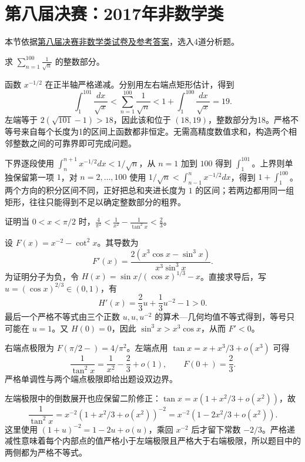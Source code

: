 \documentclass[UTF8,12pt,a4paper,fontset=fandol]{ctexart}
\begin{document}
\section{第八届决赛：2017年非数学类}
本节依据\href{https://math.ecnu.edu.cn/llin/pdf_files/nonmathfinalans2017.pdf}{第八届决赛非数学类试卷及参考答案}，选入4道分析题。

\begin{example}\label{nm-final8-1d}
求 $\displaystyle\sum_{n=1}^{100}\frac1{\sqrt n}$ 的整数部分。
\end{example}
\begin{solve}
函数 $x^{-1/2}$ 在正半轴严格递减。分别用左右端点矩形估计，得到
\[
 \int_1^{101}\frac{dx}{\sqrt x}
 <\sum_{n=1}^{100}\frac1{\sqrt n}
 <1+\int_1^{100}\frac{dx}{\sqrt x}=19.
\]
左端等于 $2(\sqrt{101}-1)>18$，因此该和位于 $(18,19)$，整数部分为18。严格不等号来自每个长度为1的区间上函数都非恒定。无需高精度数值求和，构造两个相邻整数之间的可靠界即可完成问题。

下界逐段使用 $\int_n^{n+1}x^{-1/2}dx<1/\sqrt n$，从 $n=1$ 加到 $100$ 得到 $\int_1^{101}$。上界则单独保留第一项 $1$，对 $n=2,\ldots,100$ 使用 $1/\sqrt n<\int_{n-1}^nx^{-1/2}dx$，得到 $1+\int_1^{100}$。两个方向的积分区间不同，正好把总和夹进长度为 $1$ 的区间；若两边都用同一组矩形，往往只能得到不足以确定整数部分的粗界。

\end{solve}

\begin{example}\label{nm-final8-2}
证明当 $0<x<\pi/2$ 时，$\displaystyle\frac4{\pi^2}<\frac1{x^2}-\frac1{\tan^2x}<\frac23$。
\end{example}
\begin{solve}
设 $F(x)=x^{-2}-\cot^2x$。其导数为
\[
 F'(x)=\frac{2(x^3\cos x-\sin^3x)}{x^3\sin^3x}.
\]
为证明分子为负，令 $H(x)=\sin x/(\cos x)^{1/3}-x$。直接求导后，写 $u=(\cos x)^{2/3}\in(0,1)$，有
\[
 H'(x)=\frac23u+\frac13u^{-2}-1>0.
\]
最后一个严格不等式由三个正数 $u,u,u^{-2}$ 的算术—几何均值不等式得到，等号只可能在 $u=1$。又 $H(0)=0$，因此 $\sin^3x>x^3\cos x$，从而 $F'<0$。

右端点极限为 $F(\pi/2-)=4/\pi^2$。左端点用 $\tan x=x+x^3/3+o(x^3)$ 可得
\[
 \frac1{\tan^2x}=\frac1{x^2}-\frac23+o(1),
 \qquad F(0+)=\frac23.
\]
严格单调性与两个端点极限即给出题设双边界。

左端极限中的倒数展开也应保留二阶修正：$\tan x=x(1+x^2/3+o(x^2))$，故
\[
\frac1{\tan^2x}=x^{-2}(1+x^2/3+o(x^2))^{-2}
=x^{-2}(1-2x^2/3+o(x^2)).
\]
这里使用 $(1+u)^{-2}=1-2u+o(u)$，乘回 $x^{-2}$ 后才留下常数 $-2/3$。严格递减性意味着每个内部点的值严格小于左端极限且严格大于右端极限，所以题目中的两侧都为严格不等式。

\end{solve}
\end{document}
